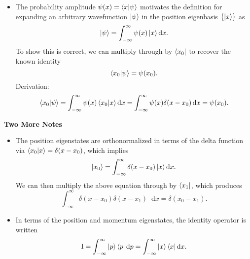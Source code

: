 \documentclass[11pt, a4paper]{article}
\newcommand{\diff}{\mathop{}\!\mathrm{d}} %
\newcommand{\II}{\operatorname{I}}  %
\begin{document}
\begin{itemize}
    \item The probability amplitude $ \psi(x) = \braket{x}{\psi} $ motivates the definition for expanding an arbitrary wavefunction $ \ket{\psi} $ in the position eigenbasis $ \{\ket{x}\} $ as
    \begin{equation*}
        \ket{\psi} = \int_{-\infty}^{\infty} \psi(x) \ket{x}\diff x.
    \end{equation*}
    To show this is correct, we can multiply through by $ \bra{x_{0}} $ to recover the known identity
    \begin{equation*}
        \braket{x_{0}}{\psi} = \psi(x_{0}).
    \end{equation*}
    Derivation: 
    \begin{equation*}
        \braket{x_{0}}{\psi} = \int_{-\infty}^{\infty}\psi(x) \braket{x_{0}}{x} \diff x = \int_{-\infty}^{\infty}\psi(x) \delta(x - x_{0}) \diff x = \psi(x_{0}).
    \end{equation*}
    
    
    
\end{itemize}

\textbf{Two More Notes}
\begin{itemize}
    \item The position eigenstates are orthonormalized in terms of the delta function via $ \braket{x_{0}}{x} = \delta(x - x_{0}) $, which implies
    \begin{equation*}
        \ket{x_{0}} = \int_{-\infty}^{\infty}\delta(x - x_{0})\ket{x}\diff x.
    \end{equation*}
    We can then multiply the above equation through by $ \bra{x_{1}} $, which produces
    \begin{equation*}
        \int_{-\infty}^{\infty}\delta(x - x_{0})\delta(x - x_{1}) \diff x = \delta(x_{0} - x_{1}).
    \end{equation*}
    
    \item In terms of the position and momentum eigenstates, the identity operator is written
    \begin{equation*}
        \II = \int_{-\infty}^{\infty}\ket{p}\bra{p}\diff p = \int_{-\infty}^{\infty}\ket{x}\bra{x}\diff x.
    \end{equation*}
    
\end{itemize}


		
\newpage
\end{document}
